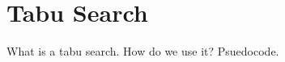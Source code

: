 \section{Tabu Search}

\begin{minipage}{\linewidth}

\end{minipage}

What is a tabu search. How do we use it?
Psuedocode.

